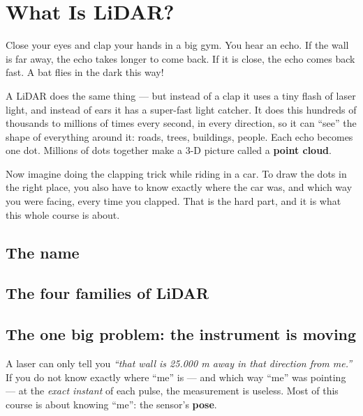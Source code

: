 \chapter{What Is LiDAR?}

\begin{kid}
Close your eyes and clap your hands in a big gym. You hear an echo. If the wall is far away, the echo takes longer to come back. If it is close, the echo comes back fast. A bat flies in the dark this way!

A LiDAR does the same thing --- but instead of a clap it uses a tiny flash of laser light, and instead of ears it has a super-fast light catcher. It does this hundreds of thousands to millions of times every second, in every direction, so it can ``see'' the shape of everything around it: roads, trees, buildings, people. Each echo becomes one dot. Millions of dots together make a 3-D picture called a \textbf{point cloud}.

Now imagine doing the clapping trick while riding in a car. To draw the dots in the right place, you also have to know exactly where the car was, and which way you were facing, every time you clapped. That is the hard part, and it is what this whole course is about.
\end{kid}

\section{The name}


\section{The four families of LiDAR}


\section{The one big problem: the instrument is moving}

\begin{bigidea}
A laser can only tell you \emph{``that wall is 25.000 m away in that direction from me.''} If you do not know exactly where ``me'' is --- and which way ``me'' was pointing --- at the \emph{exact instant} of each pulse, the measurement is useless. Most of this course is about knowing ``me'': the sensor's \textbf{pose}.
\end{bigidea}

